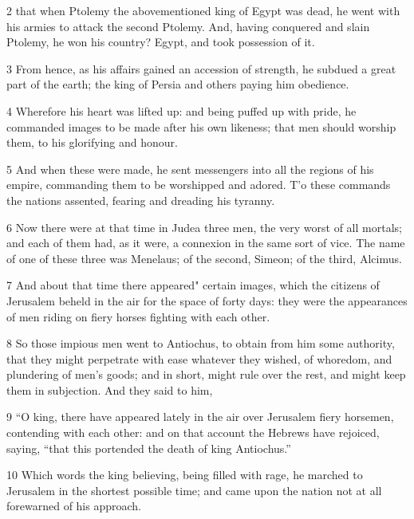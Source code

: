\par 2 that when Ptolemy the abovementioned king of Egypt was dead, he went with his armies to attack the second Ptolemy. And, having conquered and slain Ptolemy, he won his country? Egypt, and took possession of it. 

\par 3 From hence, as his affairs gained an accession of strength, he subdued a great part of the earth; the king of Persia and others paying him obedience. 

\par 4 Wherefore his heart was lifted up: and being puffed up with pride, he commanded images to be made after his own likeness; that men should worship them, to his glorifying and honour. 

\par 5 And when these were made, he sent messengers into all the regions of his empire, commanding them to be worshipped and adored. T’o these commands the nations assented, fearing and dreading his tyranny. 

\par 6 Now there were at that time in Judea three men, the very worst of all mortals; and each of them had, as it were, a connexion in the same sort of vice. The name of one of these three was Menelaus; of the second, Simeon; of the third, Alcimus. 

\par 7 And about that time there appeared" certain images, which the citizens of Jerusalem beheld in the air for the space of forty days: they were the appearances of men riding on fiery horses fighting with each other. 

\par 8 So those impious men went to Antiochus, to obtain from him some authority, that they might perpetrate with ease whatever they wished, of whoredom, and plundering of men’s goods; and in short, might rule over the rest, and might keep them in subjection. And they said to him, 

\par 9 “O king, there have appeared lately in the air over Jerusalem fiery horsemen, contending with each other: and on that account the Hebrews have rejoiced, saying, “that this portended the death of king Antiochus.” 

\par 10 Which words the king believing, being filled with rage, he marched to Jerusalem in the shortest possible time; and came upon the nation not at all forewarned of his approach. 

